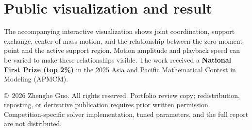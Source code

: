 \documentclass[10pt,letterpaper]{article}
\begin{document}
\section*{Public visualization and result}
The accompanying interactive visualization shows joint coordination, support exchange, center-of-mass motion, and the relationship between the zero-moment point and the active support region. Motion amplitude and playback speed can be varied to make these relationships visible. The work received a \textbf{National First Prize (top 2\%)} in the 2025 Asia and Pacific Mathematical Contest in Modeling (APMCM).

\vfill
{\footnotesize \copyright\ 2026 Zhenghe Guo. All rights reserved. Portfolio review copy; redistribution, reposting, or derivative publication requires prior written permission. Competition-specific solver implementation, tuned parameters, and the full report are not distributed.}
\end{document}
